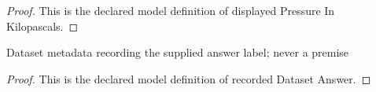 \begin{proof}
  This is the declared model definition of displayed Pressure In Kilopascals.
\end{proof}
\begin{definition}
  \label{def:physics:phyx-mini-0458:phyxminiproblems-problemphyxmini0458-recordeddatasetanswer}
  Dataset metadata recording the supplied answer label; never a premise
\end{definition}
\begin{proof}
  This is the declared model definition of recorded Dataset Answer.
\end{proof}
